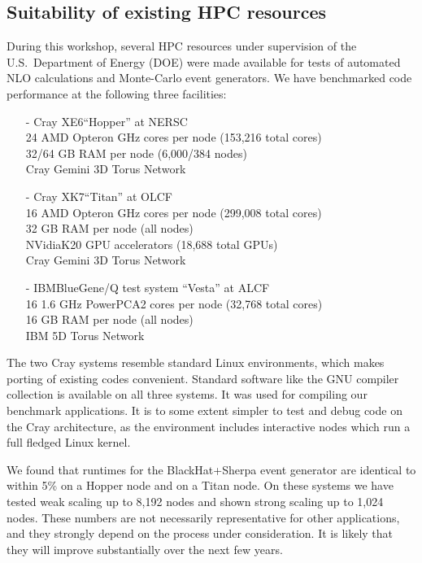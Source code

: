 \subsection{Suitability of existing HPC resources}
During this workshop, several HPC resources under supervision of the
U.S.\ Department of Energy (DOE) were made available for tests of
automated NLO calculations and Monte-Carlo event generators.  We have
benchmarked code performance at the following three facilities:
\begin{itemize}
\item[-] Cray XE6\trademark ``Hopper'' at NERSC~\cite{NERSC}\\
  24 AMD Opteron GHz cores per node (153,216 total cores)\\
  32/64 GB RAM per node (6,000/384 nodes)\\
  Cray Gemini 3D Torus Network
\item[-] Cray XK7\trademark ``Titan'' at OLCF~\cite{OLCF}\\
  16 AMD Opteron GHz cores per node (299,008 total cores)\\
  32 GB RAM per node (all nodes)\\
  NVidia\registered K20 GPU accelerators (18,688 total GPUs)\\
  Cray Gemini 3D Torus Network
\item[-] IBM\registered BlueGene\registered/Q test system ``Vesta'' at ALCF~\cite{ALCF}\\
  16 1.6 GHz PowerPC\registered A2 cores per node (32,768 total cores)\\
  16 GB RAM per node (all nodes)\\
  IBM 5D Torus Network
\end{itemize}

The two Cray systems resemble standard Linux environments,
which makes porting of existing codes convenient. Standard software
like the GNU compiler collection is available on all three systems. 
It was used for compiling our benchmark applications. It is to some 
extent simpler to test and debug code on the Cray architecture, 
as the environment includes interactive nodes which run a full fledged
Linux kernel.

We found that runtimes for the BlackHat+Sherpa event generator are identical 
to within 5\% on a Hopper node and on a Titan node. On these systems we have 
tested weak scaling up to 8,192 nodes and shown strong scaling up to 1,024 nodes.
These numbers are not necessarily representative for other applications, 
and they strongly depend on the process under consideration. 
It is likely that they will improve substantially over the next few years.

